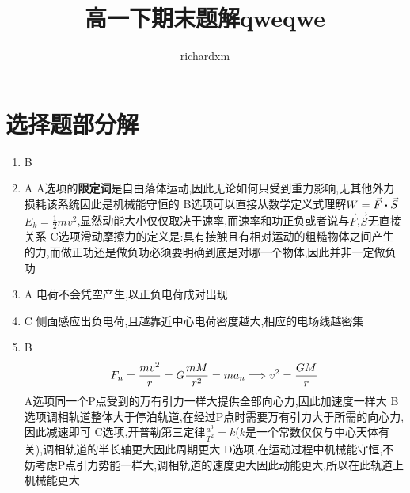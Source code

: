 
\usepackage{microtype}
\hfuzz=10001pt %

\title{高一下期末题解qweqwe}
\author{richardxm}





    \maketitle
    \tableofcontents
    \newpage


    \section{选择题部分解}

        \begin{enumerate}
            \item B 
            \item A     \newline
            A选项的\textbf{限定词}是自由落体运动,因此无论如何只受到重力影响,无其他外力损耗该系统因此是机械能守恒的   \newline 
            B选项可以直接从数学定义式理解$ W = \vec{F} \vdot \vec{S} $ \quad $ E_{k} = \frac{1}{2} m v^{2} $,显然动能大小仅仅取决于速率,而速率和功正负或者说与$\vec{F}$,$\vec{S}$无直接关系     \newline
            C选项滑动摩擦力的定义是:具有接触且有相对运动的粗糙物体之间产生的力,而做正功还是做负功必须要明确到底是对哪一个物体,因此并非一定做负功
            \item A     \newline
            电荷不会凭空产生,以正负电荷成对出现
            \item C     \newline 
            侧面感应出负电荷,且越靠近中心电荷密度越大,相应的电场线越密集
            \item B     
            $$
            F_{n} = \frac{m v^{2}}{r} = G\frac{mM}{r^{2}} = m a_{n} \Longrightarrow v^{2} = \frac{GM}{r}
            $$
            A选项同一个P点受到的万有引力一样大提供全部向心力,因此加速度一样大   \newline
            B选项调相轨道整体大于停泊轨道,在经过P点时需要万有引力大于所需的向心力,因此减速即可  \newline
            C选项,开普勒第三定律$ \frac{a^{3}}{T^{2}} = k $($k$是一个常数仅仅与中心天体有关),调相轨道的半长轴更大因此周期更大   \newline
            D选项,在运动过程中机械能守恒,不妨考虑P点引力势能一样大,调相轨道的速度更大因此动能更大,所以在此轨道上机械能更大

\end{enumerate}
